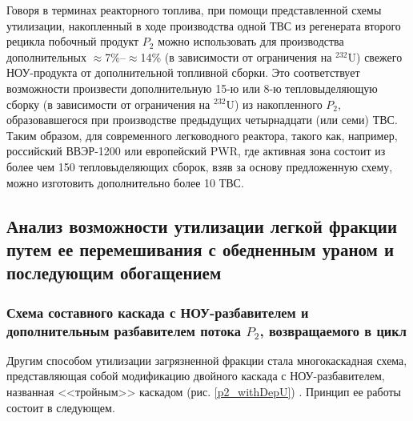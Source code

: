 Говоря в терминах реакторного топлива, при помощи представленной схемы утилизации, накопленный в ходе производства одной ТВС из регенерата второго рецикла побочный продукт $P_2$ можно использовать для производства дополнительных $\approx$7\%--$\approx$14\% (в зависимости от ограничения на $^{232}$U) свежего НОУ-продукта от дополнительной топливной сборки. Это соответствует возможности произвести дополнительную 15-ю или 8-ю тепловыделяющую сборку (в зависимости от ограничения на $^{232}$U) из накопленного $P_2$, образовавшегося при производстве предыдущих четырнадцати (или семи) ТВС. Таким образом, для современного легководного реактора, такого как, например, российский ВВЭР-1200 или европейский PWR, где активная зона состоит из более чем 150 тепловыделяющих сборок, взяв за основу предложенную схему, можно изготовить дополнительно более 10 ТВС. 





\subsection{Анализ возможности утилизации легкой фракции путем ее перемешивания с обедненным ураном и последующим обогащением}

\subsubsection{Схема составного каскада с НОУ-разбавителем и дополнительным разбавителем потока $P_2$, возвращаемого в цикл}

Другим способом утилизации загрязненной фракции стала многокаскадная схема, представляющая собой модификацию двойного каскада с НОУ-разбавителем, названная <<тройным>> каскадом (рис. \ref{p2_withDepU}) \cite{smirnovApplyingEnrichmentCapacities2018}. Принцип ее работы состоит в следующем.

